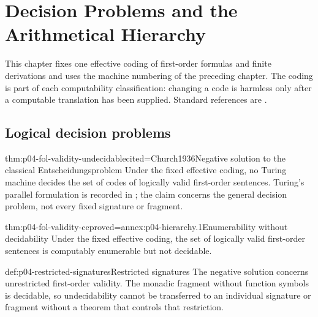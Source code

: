 
\chapter[Decision Problems and Hierarchy]{Decision Problems and the Arithmetical Hierarchy}
\label{sec:p04-decision-hierarchy}

This chapter fixes one effective coding of first-order formulas and finite
derivations and uses the machine numbering of the preceding chapter.  The
coding is part of each computability classification: changing a code is
harmless only after a computable translation has been supplied.  Standard
references are \cite{Church1936,Turing1937,Shoenfield1967,
BoolosBurgessJeffrey2007}.

\section{Logical decision problems}
\label{sec:p04-logical-decision-problems}

\begin{hbtheorem}{thm:p04-fol-validity-undecidable}{cited=Church1936}{Negative solution to the classical Entscheidungsproblem}
Under the fixed effective coding, no Turing machine decides the set of codes
of logically valid first-order sentences.  Turing's parallel formulation is
recorded in \cite{Turing1937}; the claim concerns the general decision problem,
not every fixed signature or fragment.
\end{hbtheorem}

\begin{hbcorollary}{thm:p04-fol-validity-ce}{proved=annex:p04-hierarchy.1}{Enumerability without decidability}
Under the fixed effective coding, the set of logically valid first-order
sentences is computably enumerable but not decidable.
\end{hbcorollary}

\begin{hbwarning}{def:p04-restricted-signatures}{Restricted signatures}
The negative solution concerns unrestricted first-order validity.  The monadic
fragment without function symbols is decidable, so undecidability cannot be
transferred to an individual signature or fragment without a theorem that
controls that restriction.
\end{hbwarning}

